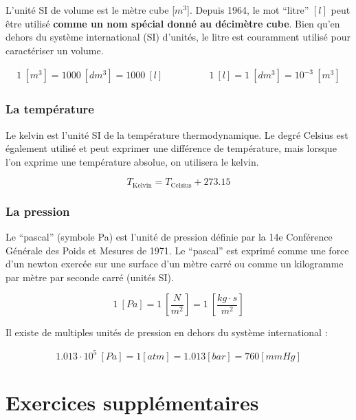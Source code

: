 \documentclass[
  11pt,
  french,
  a4paper,
  openany]{book}
\begin{document}
L'unité SI de volume est le mètre cube {[}\(m^3\){]}. Depuis 1964, le mot ``litre'' \([l]\) peut être utilisé \textbf{comme un nom spécial donné au décimètre cube}. Bien qu'en dehors du système international (SI) d'unités, le litre est couramment utilisé pour caractériser un volume.

\[
\begin{split}
  1\ \left[m^3\right] = 1000\ \left[dm^3\right] = 1000\ \left[l\right]
\end{split}
\qquad\qquad
\begin{split}
    1\ \left[l\right] = 1\ \left[dm^3\right] = 10^{-3}\ \left[m^3\right]
\end{split}
\]

\hypertarget{la-tempuxe9rature}{%
\subsubsection{La température}\label{la-tempuxe9rature}}

Le kelvin est l'unité SI de la température thermodynamique. Le degré Celsius est également utilisé et peut exprimer une différence de température, mais lorsque l'on exprime une température absolue, on utilisera le kelvin.

\[
T_{{\mathrm{Kelvin}}}=T_{{\mathrm {Celsius}}} + 273.15
\]

\hypertarget{la-pression}{%
\subsubsection{La pression}\label{la-pression}}

Le ``pascal'' (symbole Pa) est l'unité de pression définie par la 14e Conférence Générale des Poids et Mesures de 1971. Le ``pascal'' est exprimé comme une force d'un newton exercée sur une surface d'un mètre carré ou comme un kilogramme par mètre par seconde carré (unités SI).

\[
1\ \left[Pa\right] = 1\ \left[\frac{N}{m^2}\right] = 1\ \left[\frac{kg \cdot s}{m^2}\right]
\]

Il existe de multiples unités de pression en dehors du système international :

\[
1.013 \cdot 10^{5}\ \left[Pa\right] =
1 \left[atm\right] =
1.013 \left[bar\right] =
760 \left[mmHg\right]
\]

\newpage

\hypertarget{exercices-suppluxe9mentaires-11}{%
\section{Exercices supplémentaires}\label{exercices-suppluxe9mentaires-11}}
\end{document}
